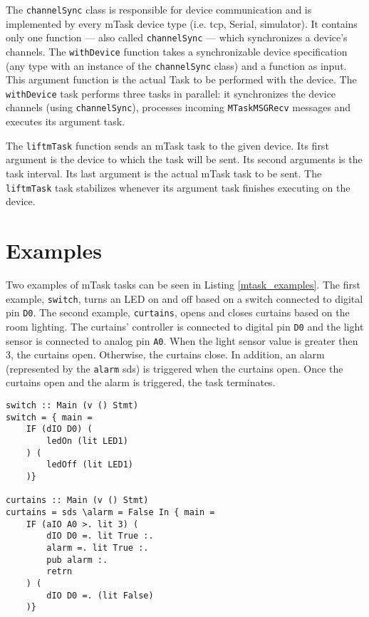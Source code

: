 The \texttt{channelSync} class is responsible for device communication and is implemented by every \gls{mTask} device type (i.e. \acs{tcp}, Serial, simulator). It contains only one function --- also called \texttt{channelSync} --- 
which synchronizes a device's channels. The \texttt{withDevice} function takes a synchronizable device specification (any type with an instance of the \texttt{channelSync} class) and a function as input. This argument function is the actual Task to be performed with the device. The \texttt{withDevice} task performs three tasks in parallel: it synchronizes the device channels (using \texttt{channelSync}), processes incoming \texttt{MTaskMSGRecv} messages and executes its argument task. 

The \texttt{liftmTask} function sends an \gls{mTask} task to the given device. Its first argument is the device to which the task will be sent. Its second arguments is the task interval. Its last argument is the actual \gls{mTask} task to be sent. The \texttt{liftmTask} task stabilizes whenever its argument task finishes executing on the device. 

\section{Examples}

Two examples of \gls{mTask} tasks can be seen in Listing \ref{mtask_examples}. The first example, \texttt{switch}, turns an LED on and off based on a switch connected to digital pin \texttt{D0}. The second example, \texttt{curtains}, opens and closes curtains based on the room lighting. The curtains' controller is connected to digital pin \texttt{D0} and the light sensor is connected to analog pin \texttt{A0}. When the light sensor value is greater then 3, the curtains open. Otherwise, the curtains close. In addition, an alarm (represented by the \texttt{alarm} \ac{sds}) is triggered when the curtains open. Once the curtains open and the alarm is triggered, the task terminates.

\begin{lstlisting}[caption=Examples of mTask tasks,captionpos=b,label=mtask_examples]
switch :: Main (v () Stmt) 
switch = { main = 
	IF (dIO D0) (
		ledOn (lit LED1)
	) (
		ledOff (lit LED1)
	)}
	
curtains :: Main (v () Stmt)
curtains = sds \alarm = False In { main = 
	IF (aIO A0 >. lit 3) (
		dIO D0 =. lit True :.
		alarm =. lit True :.
		pub alarm :.
		retrn
	) (
		dIO D0 =. (lit False)
	)}
\end{lstlisting}





